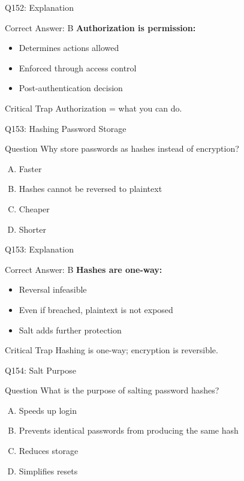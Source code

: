 \documentclass{beamer}
\begin{document}
	\begin{frame}{Q152: Explanation}
		\begin{block}{Correct Answer: B}
			\textbf{Authorization is permission:}
			\begin{itemize}
				\item Determines actions allowed
				\item Enforced through access control
				\item Post-authentication decision
			\end{itemize}
		\end{block}
		\begin{alertblock}{Critical Trap}
			Authorization = what you can do.
		\end{alertblock}
	\end{frame}
	
	\begin{frame}{Q153: Hashing Password Storage}
		\begin{block}{Question}
			Why store passwords as hashes instead of encryption?
		\end{block}
		\begin{enumerate}[(A)]
			\item Faster
			\item Hashes cannot be reversed to plaintext
			\item Cheaper
			\item Shorter
		\end{enumerate}
	\end{frame}
	
	\begin{frame}{Q153: Explanation}
		\begin{block}{Correct Answer: B}
			\textbf{Hashes are one-way:}
			\begin{itemize}
				\item Reversal infeasible
				\item Even if breached, plaintext is not exposed
				\item Salt adds further protection
			\end{itemize}
		\end{block}
		\begin{alertblock}{Critical Trap}
			Hashing is one-way; encryption is reversible.
		\end{alertblock}
	\end{frame}
	
	\begin{frame}{Q154: Salt Purpose}
		\begin{block}{Question}
			What is the purpose of salting password hashes?
		\end{block}
		\begin{enumerate}[(A)]
			\item Speeds up login
			\item Prevents identical passwords from producing the same hash
			\item Reduces storage
			\item Simplifies resets
		\end{enumerate}
	\end{frame}
	
\end{document}
